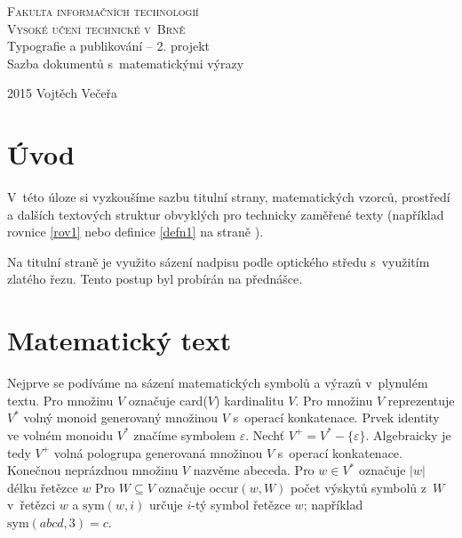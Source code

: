 \documentclass[11pt,a4paper,twocolumn]{article}
\theoremstyle{definition}
\theoremstyle{lemma}
\begin{document}
\begin{titlepage}
  \begin{center}

    \textsc{\Huge Fakulta informačních technologií\\Vysoké učení technické v~Brně}\\
    \LARGE Typografie a publikování -- 2. projekt\\Sazba dokumentů
s~matematickými výrazy\\
  \end{center}
  {\Large 2015 \hfill Vojtěch Večeřa}
\end{titlepage}

\section*{Úvod}
\label{uvod}
\noindent V~této úloze si vyzkoušíme sazbu titulní strany, matematických vzorců, prostředí a
dalších textových struktur obvyklých pro technicky zaměřené texty (například rovnice \ref{rov1}
nebo definice \ref{defn1} na straně \pageref{defn1}).

\indent Na titulní straně je využito sázení nadpisu podle optického středu s~využitím zlatého řezu. Tento postup byl probírán na přednášce.

\section{Matematický text}
\label{mattext}
\noindent Nejprve se podíváme na sázení matematických symbolů a výrazů v~plynulém textu. Pro
množinu $V$ označuje card($V$) kardinalitu $V$. Pro množinu $V$ reprezentuje $V^*$ volný monoid
generovaný množinou $V$ s~operací konkatenace.
Prvek identity ve volném monoidu $V^*$ značíme symbolem $\varepsilon$.
Nechť $V^+ =V^*-\{\varepsilon\}$. Algebraicky je tedy $V^+$ volná pologrupa generovaná množinou
$V$ s~operací konkatenace. Konečnou neprázdnou množinu $V$ nazvěme abeceda.
Pro $w \in V^*$ označuje $|w|$ délku řetězce $w$ Pro $W \subseteq V$ označuje $\mathrm{occur}(w,
W)$ počet výskytů symbolů z~$W$ v~řetězci $w$ a $\mathrm{sym}(w, i)$ určuje $i$-tý symbol řetězce
$w$; například $\mathrm{sym}(abcd, 3) = c$.
\end{document}

